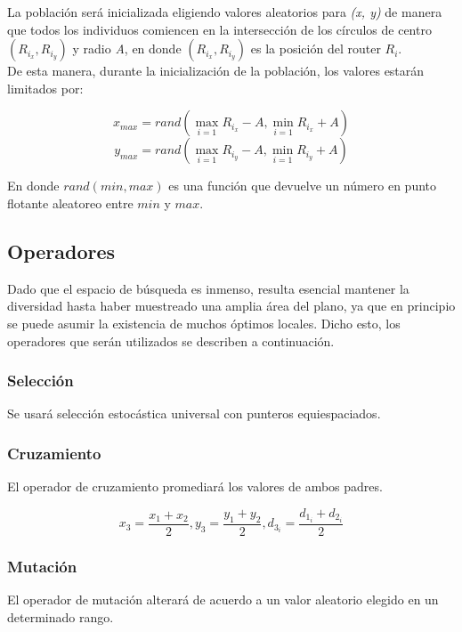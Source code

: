 \documentclass[journal]{IEEEtran}
\begin{document}
La población será inicializada eligiendo valores aleatorios para \textit{(x, y)} de manera que todos los individuos comiencen  en la intersección de los círculos de centro $(R_{i_x}, R_{i_y})$ y radio \textit{A}, en donde $(R_{i_x}, R_{i_y})$ es la posición del router $R_i$.\\

De esta manera, durante la inicialización de la población, los valores estarán limitados por:

$$x_{max} = rand(\max_{i=1} {R_{i_x} - A}, \min_{i=1} {R_{i_x} + A})$$
$$y_{max} = rand(\max_{i=1} {R_{i_y} - A}, \min_{i=1} {R_{i_y} + A})$$

En donde $rand(min, max)$ es una función que devuelve un número en punto flotante aleatoreo entre $min$ y $max$.

\subsection{Operadores}

Dado que el espacio de búsqueda es inmenso, resulta esencial mantener la diversidad hasta haber muestreado una amplia área del plano, ya que en principio se puede asumir la existencia de muchos óptimos locales. Dicho esto, los operadores que serán utilizados se describen a continuación.\\

\subsubsection{Selección}

Se usará selección estocástica universal con punteros equiespaciados.\\

\subsubsection{Cruzamiento}

El operador de cruzamiento promediará los valores de ambos padres.

$$x_3 = \frac {x_1 + x_2} {2}, y_3 = \frac {y_1 + y_2} {2}, d_{3_i} = \frac {d_{1_i} + d_{2_i}} {2}$$

\subsubsection{Mutación}

El operador de mutación alterará de acuerdo a un valor aleatorio elegido en un determinado rango.
\end{document}
